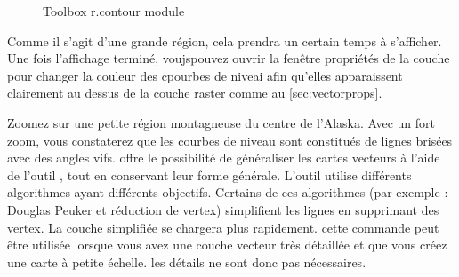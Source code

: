 {\begin{figure}[ht]
\centering
    \hspace{0.5cm}
   \caption{\grass Toolbox r.contour module \nixcaption}\label{fig:grass_toolbox_rcontour}
\end{figure}

Comme il s'agit d'une grande région, cela prendra un certain temps à s'afficher. 
Une fois l'affichage terminé, voujspouvez ouvrir la fenêtre propriétés de la couche pour changer la couleur des cpourbes de niveai afin qu'elles apparaissent clairement au dessus de la couche raster comme au \ref{sec:vectorprops}.


Zoomez sur une petite région montagneuse du centre de l'Alaska. Avec un fort zoom, vous constaterez que les courbes de niveau sont constitués de lignes brisées avec des angles vifs. \grass offre le possibilité de généraliser les cartes vecteurs à l'aide de l'outil , tout en conservant leur forme générale. L'outil utilise différents algorithmes ayant différents objectifs. Certains de ces algorithmes (par exemple : Douglas Peuker et réduction de vertex) simplifient les lignes en supprimant des vertex. La couche simplifiée se chargera plus rapidement. cette commande peut être utilisée lorsque vous avez une couche vecteur très détaillée et que vous créez une carte à petite échelle. les détails ne sont donc pas nécessaires.

}
